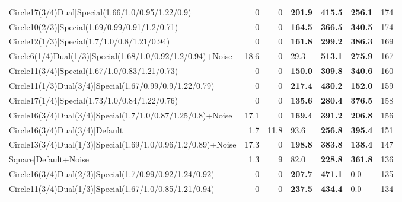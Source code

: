 \begin{tabular}{lrrlllr}
 Circle17(3/4)Dual|Special(1.66/1.0/0.95/1.22/0.9)              &          0   &            0   & \textbf{201.9} & \textbf{415.5} & \textbf{256.1} &          174 \\
 Circle10(2/3)|Special(1.69/0.99/0.91/1.2/0.71)                 &          0   &            0   & \textbf{164.5} & \textbf{366.5} & \textbf{340.5} &          174 \\
 Circle12(1/3)|Special(1.7/1.0/0.8/1.21/0.94)                   &          0   &            0   & \textbf{161.8} & \textbf{299.2} & \textbf{386.3} &          169 \\
 Circle6(1/4)Dual(1/3)|Special(1.68/1.0/0.92/1.2/0.94)+Noise    &         18.6 &            0   & 29.3           & \textbf{513.1} & \textbf{275.9} &          167 \\
 Circle11(3/4)|Special(1.67/1.0/0.83/1.21/0.73)                 &          0   &            0   & \textbf{150.0} & \textbf{309.8} & \textbf{340.6} &          160 \\
 Circle11(1/3)Dual(3/4)|Special(1.67/0.99/0.9/1.22/0.79)        &          0   &            0   & \textbf{217.4} & \textbf{430.2} & \textbf{152.0} &          159 \\
 Circle17(1/4)|Special(1.73/1.0/0.84/1.22/0.76)                 &          0   &            0   & \textbf{135.6} & \textbf{280.4} & \textbf{376.5} &          158 \\
 Circle16(3/4)Dual(3/4)|Special(1.7/1.0/0.87/1.25/0.8)+Noise    &         17.1 &            0   & \textbf{169.4} & \textbf{391.2} & \textbf{206.8} &          156 \\
 Circle16(3/4)Dual(3/4)|Default                                 &          1.7 &           11.8 & 93.6           & \textbf{256.8} & \textbf{395.4} &          151 \\
 Circle13(3/4)Dual(1/3)|Special(1.69/1.0/0.96/1.2/0.89)+Noise   &         17.3 &            0   & \textbf{198.8} & \textbf{383.8} & \textbf{138.4} &          147 \\
 Square|Default+Noise                                           &          1.3 &            9   & 82.0           & \textbf{228.8} & \textbf{361.8} &          136 \\
 Circle16(3/4)Dual(2/3)|Special(1.7/0.99/0.92/1.24/0.92)        &          0   &            0   & \textbf{207.7} & \textbf{471.1} & 0.0            &          135 \\
 Circle11(3/4)Dual(1/3)|Special(1.67/1.0/0.85/1.21/0.94)        &          0   &            0   & \textbf{237.5} & \textbf{434.4} & 0.0            &          134 \\

\end{tabular}
